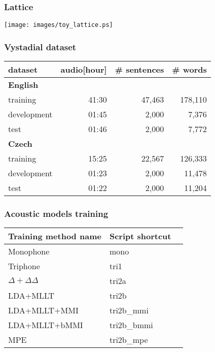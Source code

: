 \begin{frame}\frametitle{Lattice} 


    \texttt{[image: images/toy\_lattice.ps]}
\end{frame}

\begin{frame}\frametitle{Vystadial dataset} 
    \begin{tabular}{lrrr}
        \hline
        dataset & audio[hour] & \# sentences & \# words \\
        \hline
        \textbf{English} & & & \\
                training & 41:30 & 47,463 & 178,110 \\
                development & 01:45 & 2,000 & 7,376 \\
                test & 01:46 & 2,000 & 7,772 \\
        \hline
        \textbf{Czech} & & & \\
                training & 15:25 & 22,567 & 126,333 \\
                development & 01:23 & 2,000 & 11,478 \\
                test & 01:22 & 2,000 & 11,204 \\
        \hline
		\end{tabular}
\end{frame}


\begin{frame}\frametitle{Acoustic models training} 
    
    \small{\begin{tabular}{lll}
    \hline
    Training method name & Script shortcut \\
    \hline
    Monophone & mono \\
    Triphone  & tri1 \\
    $\Delta + \Delta\Delta$ & tri2a  \\
    LDA+MLLT & tri2b  \\
    LDA+MLLT+MMI & tri2b\_mmi \\
    LDA+MLLT+bMMI & tri2b\_bmmi \\
    MPE & tri2b\_mpe \\
    \hline
    \end{tabular}}
\end{frame}


